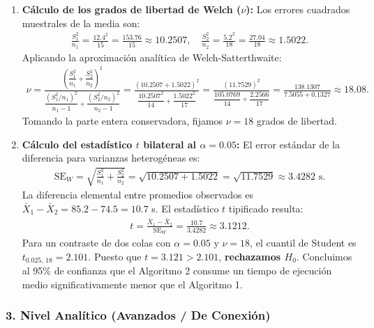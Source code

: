 \begin{solproblema}
	\begin{enumerate}
		\item \textbf{Cálculo de los grados de libertad de Welch ($\nu$):}
		Los errores cuadrados muestrales de la media son:
		\begin{align}
			\frac{S_1^2}{n_1} = \frac{12.4^2}{15} = \frac{153.76}{15} \approx 10.2507, \quad \frac{S_2^2}{n_2} = \frac{5.2^2}{18} = \frac{27.04}{18} \approx 1.5022.
		\end{align}
		Aplicando la aproximación analítica de Welch-Satterthwaite:
		\begin{align}
			\nu = \frac{\left( \dfrac{S_1^2}{n_1} + \dfrac{S_2^2}{n_2} \right)^2}{\dfrac{(S_1^2 / n_1)^2}{n_1 - 1} + \dfrac{(S_2^2 / n_2)^2}{n_2 - 1}} = \frac{(10.2507 + 1.5022)^2}{\dfrac{10.2507^2}{14} + \dfrac{1.5022^2}{17}} = \frac{(11.7529)^2}{\dfrac{105.0769}{14} + \dfrac{2.2566}{17}} = \frac{138.1307}{7.5055 + 0.1327} \approx 18.08.
		\end{align}
		Tomando la parte entera conservadora, fijamos $\nu = 18$ grados de libertad.
		
		\item \textbf{Cálculo del estadístico $t$ bilateral al $\alpha = 0.05$:}
		El error estándar de la diferencia para varianzas heterogéneas es:
		\begin{align}
			\text{SE}_W = \sqrt{ \frac{S_1^2}{n_1} + \frac{S_2^2}{n_2} } = \sqrt{ 10.2507 + 1.5022 } = \sqrt{11.7529} \approx 3.4282 \text{ s.}
		\end{align}
		La diferencia elemental entre promedios observados es $\bar{X}_1 - \bar{X}_2 = 85.2 - 74.5 = 10.7$ s. El estadístico $t$ tipificado resulta:
		\begin{align}
			t = \frac{\bar{X}_1 - \bar{X}_2}{\text{SE}_W} = \frac{10.7}{3.4282} \approx 3.1212.
		\end{align}
		Para un contraste de dos colas con $\alpha = 0.05$ y $\nu = 18$, el cuantil de Student es $t_{0.025, \, 18} = 2.101$.
		Puesto que $t = 3.121 > 2.101$, \textbf{rechazamos $H_0$}. Concluimos al 95\% de confianza que el Algoritmo 2 consume un tiempo de ejecución medio significativamente menor que el Algoritmo 1.
	\end{enumerate}
\end{solproblema}

\subsubsection*{3. Nivel Analítico (Avanzados / De Conexión)}

